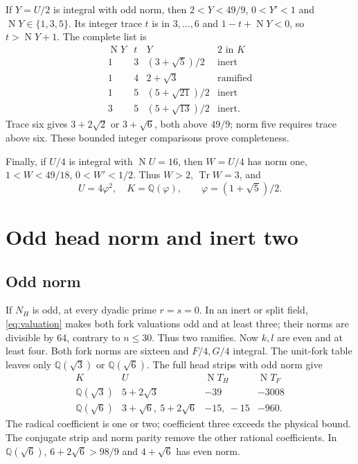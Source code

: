 \documentclass[11pt]{article}
\newcommand{\QQ}{\mathbb Q}
\newcommand{\Tr}{\operatorname{Tr}}
\newcommand{\N}{\operatorname{N}}
\begin{document}
If $Y=U/2$ is integral with odd norm, then
$2<Y<49/9$, $0<Y'<1$ and $\N Y\in\{1,3,5\}$.
Its integer trace $t$ is in $3,\ldots,6$ and
$1-t+\N Y<0$, so $t>\N Y+1$.
The complete list is
\[
\begin{array}{rcll}
\N Y&t&Y&2\text{ in }K\\\hline
1&3&(3+\sqrt5)/2&\text{inert}\\
1&4&2+\sqrt3&\text{ramified}\\
1&5&(5+\sqrt{21})/2&\text{inert}\\
3&5&(5+\sqrt{13})/2&\text{inert}.
\end{array}
\]
Trace six gives $3+2\sqrt2$ or $3+\sqrt6$, both above $49/9$;
norm five requires trace above six. These bounded integer
comparisons prove completeness.

Finally, if $U/4$ is integral with $\N U=16$, then $W=U/4$
has norm one, $1<W<49/18$, $0<W'<1/2$. Thus $W>2$,
$\Tr W=3$, and
\begin{equation}\label{eq:phihead}
 U=4\varphi^2,\quad K=\QQ(\varphi),\qquad
 \varphi=(1+\sqrt5)/2.
\end{equation}

\section{Odd head norm and inert two}\label{sec:odd-inert}

\subsection{Odd norm}
If $N_H$ is odd, at every dyadic prime $r=s=0$.
In an inert or split field, \eqref{eq:valuation} makes both fork
valuations odd and at least three; their norms are divisible by
64, contrary to $n\le30$.
Thus two ramifies. Now $k,l$ are even and at least four.
Both fork norms are sixteen and $F/4,G/4$ integral.
The unit-fork table leaves only $\QQ(\sqrt3)$ or $\QQ(\sqrt6)$.
The full head strips with odd norm give
\[
\begin{array}{c|l|r|r}
K&U&\N T_H&\N T_F\\\hline
\QQ(\sqrt3)&5+2\sqrt3&-39&-3008\\
\QQ(\sqrt6)&3+\sqrt6,\ 5+2\sqrt6&-15,\ -15&-960.
\end{array}
\]
The radical coefficient is one or two; coefficient three exceeds
the physical bound. The conjugate strip and norm parity remove
the other rational coefficients. In $\QQ(\sqrt6)$,
$6+2\sqrt6>98/9$ and $4+\sqrt6$ has even norm.
\end{document}
